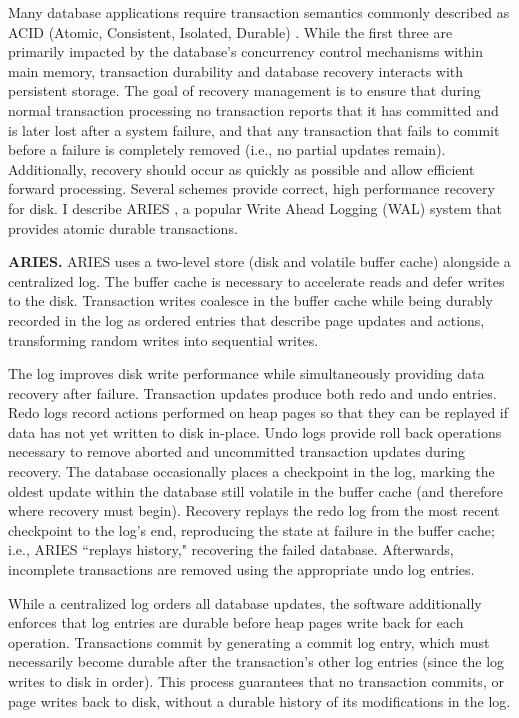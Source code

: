Many database applications require transaction semantics commonly described as ACID (Atomic, Consistent, Isolated, Durable) \cite{Gray81}.
While the first three are primarily impacted by the database's concurrency control mechanisms within main memory, transaction durability and database recovery interacts with persistent storage.
The goal of recovery management is to ensure that during normal transaction processing no transaction reports that it has committed and is later lost after a system failure, and that any transaction that fails to commit before a failure is completely removed (i.e., no partial updates remain).
Additionally, recovery should occur as quickly as possible and allow efficient forward processing.
Several schemes provide correct, high performance recovery for disk.
I describe ARIES \cite{MohanHaderle92}, a popular Write Ahead Logging (WAL) system that provides atomic durable transactions.

\textbf{ARIES.}
ARIES uses a two-level store (disk and volatile buffer cache) alongside a centralized log.
The buffer cache is necessary to accelerate reads and defer writes to the disk.
Transaction writes coalesce in the buffer cache while being durably recorded in the log as ordered entries that describe page updates and actions, transforming random writes into sequential writes.

The log improves disk write performance while simultaneously providing data recovery after failure.
Transaction updates produce both redo and undo entries.
Redo logs record actions performed on heap pages so that they can be replayed if data has not yet written to disk in-place.
Undo logs provide roll back operations necessary to remove aborted and uncommitted transaction updates during recovery.
The database occasionally places a checkpoint in the log, marking the oldest update within the database still volatile in the buffer cache (and therefore where recovery must begin).
Recovery replays the redo log from the most recent checkpoint to the log's end, reproducing the state at failure in the buffer cache; i.e., ARIES ``replays history," recovering the failed database.
Afterwards, incomplete transactions are removed using the appropriate undo log entries.

While a centralized log orders all database updates, the software additionally enforces that log entries are durable before heap pages write back for each operation.
Transactions commit by generating a commit log entry, which must necessarily become durable after the transaction's other log entries (since the log writes to disk in order).
This process guarantees that no transaction commits, or page writes back to disk, without a durable history of its modifications in the log.

